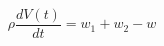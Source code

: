 \begin{equation}
  \rho \frac{dV(t)}{dt} = w_1 + w_2 - w
  \label{eq:massbalance01_1}
\end{equation}